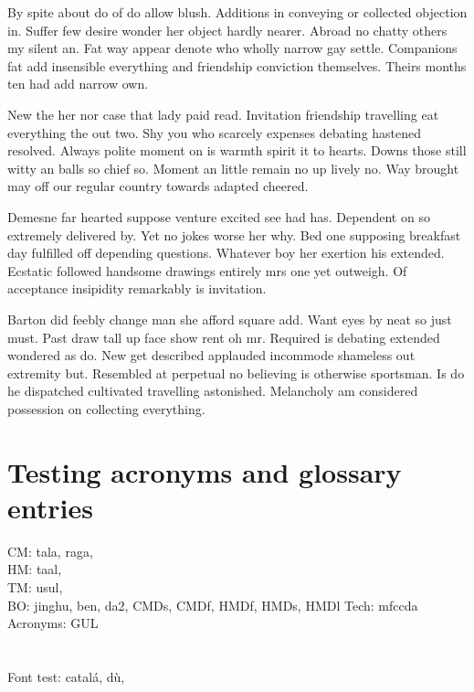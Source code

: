 By spite about do of do allow blush. Additions in conveying or collected objection in. Suffer few desire wonder her object hardly nearer. Abroad no chatty others my silent an. Fat way appear denote who wholly narrow gay settle. Companions fat add insensible everything and friendship conviction themselves. Theirs months ten had add narrow own. 

New the her nor case that lady paid read. Invitation friendship travelling eat everything the out two. Shy you who scarcely expenses debating hastened resolved. Always polite moment on is warmth spirit it to hearts. Downs those still witty an balls so chief so. Moment an little remain no up lively no. Way brought may off our regular country towards adapted cheered. 

Demesne far hearted suppose venture excited see had has. Dependent on so extremely delivered by. Yet ﻿no jokes worse her why. Bed one supposing breakfast day fulfilled off depending questions. Whatever boy her exertion his extended. Ecstatic followed handsome drawings entirely mrs one yet outweigh. Of acceptance insipidity remarkably is invitation. 

Barton did feebly change man she afford square add. Want eyes by neat so just must. Past draw tall up face show rent oh mr. Required is debating extended wondered as do. New get described applauded incommode shameless out extremity but. Resembled at perpetual no believing is otherwise sportsman. Is do he dispatched cultivated travelling astonished. Melancholy am considered possession on collecting everything. 

\section{Testing acronyms and glossary entries}
CM: \gls{tala}, \gls{raga}, \\
HM: \gls{taal}, \\
TM: \gls{usul}, \\
BO: \gls{jinghu}, \gls{ben}, \gls{da2}, \gls{CMDs}, \gls{CMDf}, \gls{HMDf}, \gls{HMDs}, \gls{HMDl}
Tech: \gls{mfccda}
Acronyms: \gls{GUL}\\ \\ \\ 
Font test: catalá, dù, 
